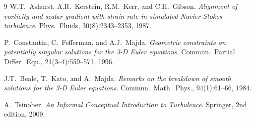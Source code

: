 \documentclass[11pt,a4paper]{article}
\begin{document}
\begin{thebibliography}{9}
W.T.\ Ashurst, A.R.\ Kerstein, R.M.\ Kerr, and C.H.\ Gibson.
\textit{Alignment of vorticity and scalar gradient with strain rate in simulated Navier-Stokes turbulence}.
Phys.\ Fluids, 30(8):2343--2353, 1987.

P.\ Constantin, C.\ Fefferman, and A.J.\ Majda.
\textit{Geometric constraints on potentially singular solutions for the 3-D Euler equations}.
Commun.\ Partial Differ.\ Equ., 21(3--4):559--571, 1996.

J.T.\ Beale, T.\ Kato, and A.\ Majda.
\textit{Remarks on the breakdown of smooth solutions for the 3-D Euler equations}.
Commun.\ Math.\ Phys., 94(1):61--66, 1984.

A.\ Tsinober.
\textit{An Informal Conceptual Introduction to Turbulence}.
Springer, 2nd edition, 2009.
\end{thebibliography}
\end{document}
